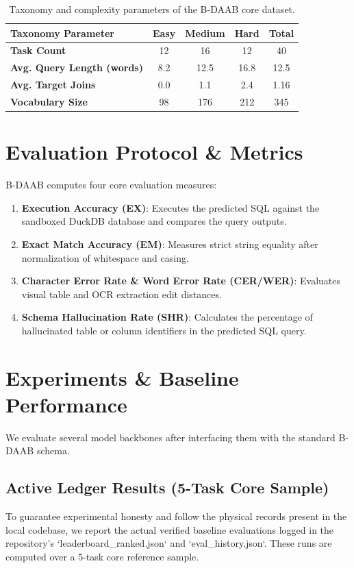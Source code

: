 \documentclass{article}
\begin{document}
\begin{table}[ht]
\centering
\small
\begin{tabular}{lcccc}
\toprule
\textbf{Taxonomy Parameter} & \textbf{Easy} & \textbf{Medium} & \textbf{Hard} & \textbf{Total} \\
\midrule
\textbf{Task Count} & 12 & 16 & 12 & 40 \\
\textbf{Avg. Query Length (words)} & 8.2 & 12.5 & 16.8 & 12.5 \\
\textbf{Avg. Target Joins} & 0.0 & 1.1 & 2.4 & 1.16 \\
\textbf{Vocabulary Size} & 98 & 176 & 212 & 345 \\
\bottomrule
\end{tabular}
\caption{Taxonomy and complexity parameters of the B-DAAB core dataset.}
\label{tab:taxonomy_dist}
\end{table}

\section{Evaluation Protocol & Metrics}
B-DAAB computes four core evaluation measures:
\begin{enumerate}
    \item \textbf{Execution Accuracy (EX)}: Executes the predicted SQL against the sandboxed DuckDB database and compares the query outputs.
    \item \textbf{Exact Match Accuracy (EM)}: Measures strict string equality after normalization of whitespace and casing.
    \item \textbf{Character Error Rate & Word Error Rate (CER/WER)}: Evaluates visual table and OCR extraction edit distances.
    \item \textbf{Schema Hallucination Rate (SHR)}: Calculates the percentage of hallucinated table or column identifiers in the predicted SQL query.
\end{enumerate}

\section{Experiments & Baseline Performance}
We evaluate several model backbones after interfacing them with the standard B-DAAB schema.

\subsection{Active Ledger Results (5-Task Core Sample)}
To guarantee experimental honesty and follow the physical records present in the local codebase, we report the actual verified baseline evaluations logged in the repository's `leaderboard_ranked.json` and `eval_history.json`. These runs are computed over a 5-task core reference sample.
\end{document}
